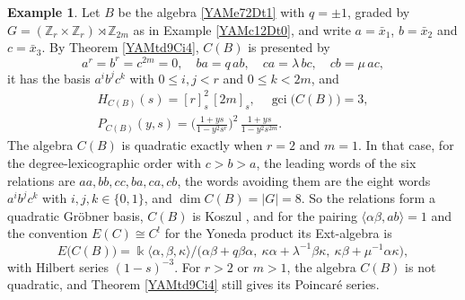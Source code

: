 \documentclass[reqno]{amsart}
\numberwithin{equation}{section}
\theoremstyle{definition}
\newtheorem{example}[equation]{Example}
\theoremstyle{remark}
\theoremstyle{plain}
\newcommand{\kk}{\Bbbk}
\DeclareMathOperator{\gci}{gci}
\begin{document}
\begin{example}\label{YAMex6Cd7}
Let $B$ be the algebra \eqref{YAMe72Dt1} with $q=\pm1$, graded by $G=(\mathbb Z_r\times\mathbb Z_r)\rtimes\mathbb Z_{2m}$ as in Example \ref{YAMc12Dt0}, and write $a=\bar x_1$, $b=\bar x_2$ and $c=\bar x_3$. By Theorem \ref{YAMtd9Ci4}, $C(B)$ is presented by
\[
a^r=b^r=c^{2m}=0,\quad ba=q\,ab,\quad ca=\lambda\,bc,\quad cb=\mu\,ac,
\]
it has the basis $a^ib^jc^k$ with $0\le i,j<r$ and $0\le k<2m$, and
\[
\begin{gathered}
H_{C(B)}(s)=[r]_s^2\,[2m]_s,\quad\gci\big(C(B)\big)=3,\\
P_{C(B)}(y,s)=\Big(\frac{1+ys}{1-y^2s^{r}}\Big)^2\,\frac{1+ys}{1-y^2s^{2m}}.
\end{gathered}
\]
The algebra $C(B)$ is quadratic exactly when $r=2$ and $m=1$. In that case, for the degree-lexicographic order with $c>b>a$, the leading words of the six relations are $aa,bb,cc,ba,ca,cb$, the words avoiding them are the eight words $a^ib^jc^k$ with $i,j,k\in\{0,1\}$, and $\dim C(B)=|G|=8$. So the relations form a quadratic Gr\"obner basis, $C(B)$ is Koszul \cite[Theorem 5.3]{Pri}, and for the pairing $\langle\alpha\beta,ab\rangle=1$ and the convention $E(C)\cong C^!$ for the Yoneda product its Ext-algebra is
\[
E\big(C(B)\big)=\kk\langle\alpha,\beta,\kappa\rangle/\big(\alpha\beta+q\beta\alpha,\ \kappa\alpha+\lambda^{-1}\beta\kappa,\ \kappa\beta+\mu^{-1}\alpha\kappa\big),
\]
with Hilbert series $(1-s)^{-3}$. For $r>2$ or $m>1$, the algebra $C(B)$ is not quadratic, and Theorem \ref{YAMtd9Ci4} still gives its Poincar\'e series.
\end{example}
\end{document}
